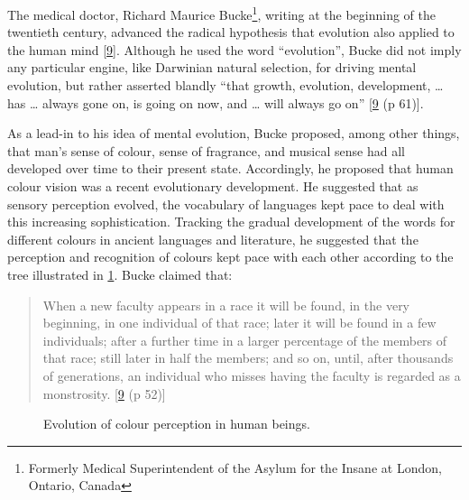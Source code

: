 \documentclass[
  a4paper,
]{article}
\begin{document}
The medical doctor, Richard Maurice Bucke\footnote{Formerly Medical
  Superintendent of the Asylum for the Insane at London, Ontario, Canada},
writing at the beginning of the twentieth century, advanced the radical
hypothesis that evolution also applied to the human mind
{[}\protect\hyperlink{ref-bucke48}{9}{]}. Although he used the word
``evolution'', Bucke did not imply any particular engine, like Darwinian
natural selection, for driving mental evolution, but rather asserted
blandly ``that growth, evolution, development, \ldots{} has \ldots{}
always gone on, is going on now, and \ldots{} will always go on''
{[}\protect\hyperlink{ref-bucke48}{9} (p 61){]}.

As a lead-in to his idea of mental evolution, Bucke proposed, among
other things, that man's sense of colour, sense of fragrance, and
musical sense had all developed over time to their present state.
Accordingly, he proposed that human colour vision was a recent
evolutionary development. He suggested that as sensory perception
evolved, the vocabulary of languages kept pace to deal with this
increasing sophistication. Tracking the gradual development of the words
for different colours in ancient languages and literature, he suggested
that the perception and recognition of colours kept pace with each other
according to the tree illustrated in \cref{fig:colour-tree}. Bucke
claimed that:

\begin{quote}
When a new faculty appears in a race it will be found, in the very
beginning, in one individual of that race; later it will be found in a
few individuals; after a further time in a larger percentage of the
members of that race; still later in half the members; and so on, until,
after thousands of generations, an individual who misses having the
faculty is regarded as a monstrosity.
{[}\protect\hyperlink{ref-bucke48}{9} (p 52){]}
\end{quote}

\begin{figure}
\hypertarget{fig:colour-tree}{%
\centering

\caption[Evolution of colour perception in human beings.]{Evolution of
colour perception in human
beings.\footnotemark{}}\label{fig:colour-tree}
}
\end{figure}
\end{document}
